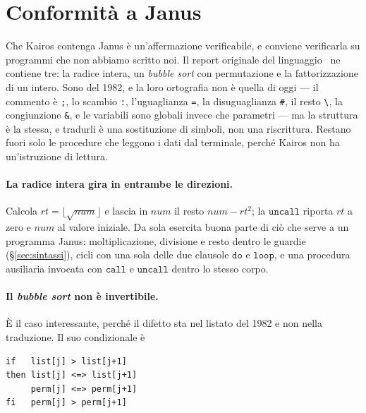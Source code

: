 \section{Conformità a Janus}
\label{sec:conformita}

Che Kairos contenga Janus è un'affermazione verificabile, e conviene verificarla
su programmi che non abbiamo scritto noi. Il report originale del
linguaggio~\cite{LutzDerby1982} ne contiene tre: la radice intera, un
\emph{bubble sort} con permutazione e la fattorizzazione di un intero. Sono del
1982, e la loro ortografia non è quella di oggi — il commento è \texttt{;}, lo
scambio \texttt{:}, l'uguaglianza \texttt{=}, la disuguaglianza \texttt{\#}, il
resto \texttt{\textbackslash}, la congiunzione \texttt{\&}, e le variabili sono
globali invece che parametri — ma la struttura è la stessa, e tradurli è una
sostituzione di simboli, non una riscrittura. Restano fuori solo le procedure
che leggono i dati dal terminale, perché Kairos non ha un'istruzione di
lettura.

\paragraph{La radice intera gira in entrambe le direzioni.} Calcola
$\mathit{rt} = \lfloor\sqrt{\mathit{num}}\rfloor$ e lascia in $\mathit{num}$
il resto $\mathit{num} - \mathit{rt}^2$; la $\mathtt{uncall}$ riporta
$\mathit{rt}$ a zero e $\mathit{num}$ al valore iniziale. Da sola esercita buona parte di ciò che serve a un programma Janus:
moltiplicazione, divisione e resto dentro le guardie (\S\ref{sec:sintassi}),
cicli con una sola delle due clausole $\mathtt{do}$ e $\mathtt{loop}$, e una procedura ausiliaria invocata
con $\mathtt{call}$ e $\mathtt{uncall}$ dentro lo stesso corpo.

\paragraph{Il \emph{bubble sort} non è invertibile.} È il caso interessante,
perché il difetto sta nel listato del 1982 e non nella traduzione. Il suo
condizionale è

\begin{lstlisting}
if   list[j] > list[j+1]
then list[j] <=> list[j+1]
     perm[j] <=> perm[j+1]
fi   perm[j] > perm[j+1]
\end{lstlisting}

